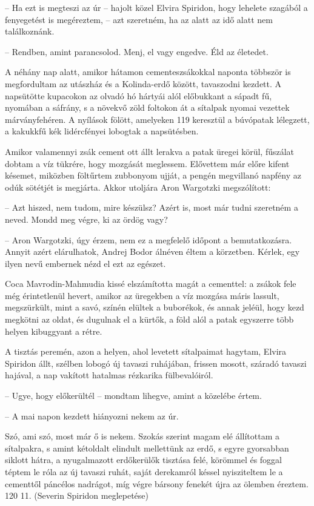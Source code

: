 \documentclass{IEEEtran}
\begin{document}
– Ha ezt is megteszi az úr – hajolt közel Elvira Spiridon, hogy lehelete
szagából a fenyegetést is megéreztem, – azt szeretném, ha az alatt az idő
alatt nem találkoznánk.

– Rendben, amint parancsolod. Menj, el vagy engedve. Éld az életedet.

A néhány nap alatt, amikor hátamon cementeszsákokkal naponta többször is
megfordultam az utászház és a Kolinda-erdő között, tavaszodni kezdett. A
napsütötte kupacokon az olvadó hó hártyái alól előbukkant a sápadt fű,
nyomában a sáfrány, s a növekvő zöld foltokon át a sítalpak nyomai vezettek
márványfehéren. A nyílások fölött, amelyeken 119 keresztül a búvópatak
lélegzett, a kakukkfű kék lidércfényei lobogtak a napsütésben.

Amikor valamennyi zsák cement ott állt lerakva a patak üregei körül, fűszálat
dobtam a víz tükrére, hogy mozgását meglessem. Elővettem már előre kifent
késemet, miközben föltűrtem zubbonyom ujját, a pengén megvillanó napfény az
odúk sötétjét is megjárta. Akkor utoljára Aron Wargotzki megszólított:

– Azt hiszed, nem tudom, mire készülsz? Azért is, most már tudni szeretném a
neved. Mondd meg végre, ki az ördög vagy?

– Aron Wargotzki, úgy érzem, nem ez a megfelelő időpont a bemutatkozásra.
Annyit azért elárulhatok, Andrej Bodor álnéven éltem a körzetben. Kérlek, egy
ilyen nevű embernek nézd el ezt az egészet.

Coca Mavrodin-Mahmudia kissé elszámította magát a cementtel: a zsákok fele még
érintetlenül hevert, amikor az üregekben a víz mozgása máris lassult,
megszürkült, mint a savó, színén elültek a buborékok, és annak jeléül, hogy
kezd megkötni az oldat, és dugulnak el a kürtők, a föld alól a patak egyszerre
több helyen kibuggyant a rétre.

A tisztás peremén, azon a helyen, ahol levetett sítalpaimat hagytam, Elvira
Spiridon állt, szélben lobogó új tavaszi ruhájában, frissen mosott, száradó
tavaszi hajával, a nap vakított hatalmas rézkarika fülbevalóiról.

– Ugye, hogy előkerültél – mondtam lihegve, amint a közelébe értem.

– A mai napon kezdett hiányozni nekem az úr.

Szó, ami szó, most már ő is nekem. Szokás szerint magam elé állítottam a
sítalpakra, s amint kétoldalt elindult mellettünk az erdő, s egyre gyorsabban
siklott hátra, a nyugalmazott erdőkerülők tisztása felé, körömmel és foggal
téptem le róla az új tavaszi ruhát, saját derekamról késsel nyisziteltem le a
cementtől páncélos nadrágot, míg végre bársony fenekét újra az ölemben
éreztem.
120
11. (Severin Spiridon meglepetése)
\end{document}
